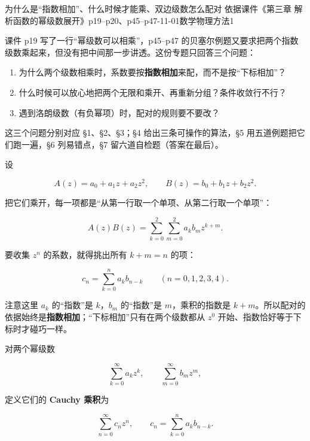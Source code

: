 \documentclass[11pt]{ctexart}
\let\origsubhdr\subhdr
\renewcommand{\subhdr}[1]{\par\needspace{4\baselineskip}\origsubhdr{#1}}
\let\orighdr\hdr
\renewcommand{\hdr}[2]{\par\needspace{9\baselineskip}\orighdr{#1}{#2}}
\begin{document}
{为什么是“指数相加”、什么时候才能乘、双边级数怎么配对}
{依据课件《第三章 解析函数的幂级数展开》p19--p20、p45--p47-11-01\quad 数学物理方法1}


课件 p19 写了一行“幂级数可以相乘”，p45--p47 的贝塞尔例题又要求把两个指数级数乘起来，但没有把中间那一步讲透。这份专题只回答三个问题：

\begin{enumerate}
\item 为什么两个级数相乘时，系数要按\textbf{指数相加}来配，而不是按“下标相加”？
\item 什么时候可以放心地把两个无限和乘开、再重新分组？条件收敛行不行？
\item 遇到洛朗级数（有负幂项）时，配对的规则要不要改？
\end{enumerate}

这三个问题分别对应 §1、§2、§3；§4 给出三条可操作的算法，§5 用五道例题把它们跑一遍，§6 列易错点，§7 留六道自检题（答案在最后）。




设

\[ A(z)=a_0+a_1z+a_2z^2,\qquad B(z)=b_0+b_1z+b_2z^2 . \]

把它们乘开，每一项都是“从第一行取一个单项、从第二行取一个单项”：

\[ A(z)B(z)=\sum_{k=0}^{2}\sum_{m=0}^{2}a_kb_mz^{k+m} . \]

要收集 $z^n$ 的系数，就得挑出所有 $k+m=n$ 的项：

\[ c_n=\sum_{k=0}^{n}a_kb_{n-k}\qquad(n=0,1,2,3,4) . \]

注意这里 $a_k$ 的“指数”是 $k$，$b_m$ 的“指数”是 $m$，乘积的指数是 $k+m$。所以配对的依据始终是\textbf{指数相加}；“下标相加”只有在两个级数都从 $z^0$ 开始、指数恰好等于下标时才碰巧一样。


对两个幂级数

\[ \sum_{k=0}^{\infty}a_kz^k,\qquad \sum_{m=0}^{\infty}b_mz^m , \]

定义它们的 \textbf{Cauchy 乘积}为

\[ \sum_{n=0}^{\infty}c_nz^n,\qquad c_n=\sum_{k=0}^{n}a_kb_{n-k} . \]
\end{document}
